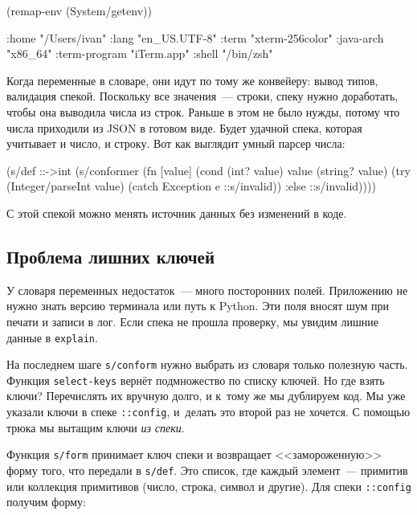 \begin{english}
  \begin{clojure}
(remap-env (System/getenv))

{:home "/Users/ivan"
 :lang "en_US.UTF-8"
 :term "xterm-256color"
 :java-arch "x86_64"
 :term-program "iTerm.app"
 :shell "/bin/zsh"}
  \end{clojure}
\end{english}

Когда переменные в словаре, они идут по тому же конвейеру: вывод типов,
валидация спекой. Поскольку все значения~--- строки, спеку нужно доработать, чтобы
она выводила числа из строк. Раньше в этом не было нужды, потому что числа
приходили из JSON в готовом виде. Будет удачной спека, которая учитывает и
число, и строку. Вот как выглядит умный парсер числа:

\begin{english}
  \begin{clojure}
(s/def ::->int
  (s/conformer
   (fn [value]
     (cond
       (int? value) value
       (string? value)
       (try (Integer/parseInt value)
            (catch Exception e
              ::s/invalid))
       :else ::s/invalid))))
  \end{clojure}
\end{english}

\noindent
С этой спекой можно менять источник данных без изменений в коде.

\subsection{Проблема лишних ключей}

У словаря переменных недостаток~--- много посторонних полей. Приложению не нужно
знать версию терминала или путь к Python. Эти поля вносят шум при печати и
записи в лог. Если спека не прошла проверку, мы увидим лишние данные в
\verb|explain|.


На последнем шаге \verb|s/conform| нужно выбрать из словаря только полезную
часть. Функция \verb|select-keys| вернёт подмножество по списку ключей. Но где
взять ключи? Перечислять их вручную долго, и к~тому же мы дублируем код. Мы уже
указали ключи в спеке \verb|::config|, и~делать это второй раз не хочется. С
помощью трюка мы вытащим ключи \emph{из спеки}.

Функция \verb|s/form| принимает ключ спеки и возвращает <<замороженную>> форму
того, что передали в \verb|s/def|. Это список, где каждый элемент~--- примитив или
коллекция примитивов (число, строка, символ и другие). Для спеки \verb|::config|
получим форму:

